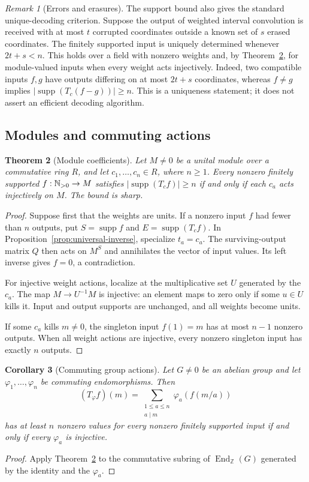 \documentclass[11pt]{article}
\DeclareMathOperator{\supp}{supp}\DeclareMathOperator{\rank}{rank}
\numberwithin{equation}{section}
\newtheorem{theorem}{Theorem}[section]
\newtheorem{corollary}[theorem]{Corollary}
\theoremstyle{definition}\newtheorem{definition}[theorem]{Definition}
\theoremstyle{remark}\newtheorem{remark}[theorem]{Remark}
\begin{document}
\begin{remark}[Errors and erasures]\label{rem:errors-erasures}
The support bound also gives the standard unique-decoding criterion.
Suppose the output of weighted interval convolution is received with at
most $t$ corrupted coordinates outside a known set of $s$ erased
coordinates. The finitely supported input is uniquely determined whenever
$2t+s<n$. This holds over a field with nonzero weights and, by
Theorem~\ref{thm:module}, for module-valued inputs when every weight acts
injectively. Indeed, two compatible inputs $f,g$ have outputs differing
on at most $2t+s$ coordinates, whereas $f\ne g$ implies
$|\supp(T_c(f-g))|\ge n$. This is a uniqueness statement; it does not
assert an efficient decoding algorithm.
\end{remark}

\subsection{Modules and commuting actions}

\begin{theorem}[Module coefficients]\label{thm:module}
Let $M\ne0$ be a unital module over a commutative ring $R$,
and let $c_1,\ldots,c_n\in R$, where $n\ge1$. Every nonzero
finitely supported $f:\mathbb N_{>0}\to M$ satisfies
$|\supp(T_cf)|\ge n$ if and only if each $c_a$ acts injectively
on $M$. The bound is sharp.
\end{theorem}
\begin{proof}
Suppose first that the weights are units. If a nonzero input $f$
had fewer than $n$ outputs, put $S=\supp f$ and $E=\supp(T_cf)$.
In Proposition~\ref{prop:universal-inverse}, specialize $t_a=c_a$.
The surviving-output matrix $Q$ then acts on $M^S$ and annihilates
the vector of input values. Its left inverse gives $f=0$, a
contradiction.

For injective weight actions, localize at the multiplicative set
$U$ generated by the $c_a$. The map $M\to U^{-1}M$ is injective:
an element maps to zero only if some $u\in U$ kills it. Input and
output supports are unchanged, and all weights become units.

If some $c_a$ kills $m\ne0$, the singleton input $f(1)=m$ has
at most $n-1$ nonzero outputs. When all weight actions are injective,
every nonzero singleton input has exactly $n$ outputs.
\end{proof}

\begin{corollary}[Commuting group actions]\label{cor:commuting-actions}
Let $G\ne0$ be an abelian group and let
$\varphi_1,\ldots,\varphi_n$ be commuting endomorphisms. Then
\[
 (T_\varphi f)(m)=
 \sum_{\substack{1\le a\le n\\a\mid m}}\varphi_a(f(m/a))
\]
has at least $n$ nonzero values for every nonzero finitely supported
input if and only if every $\varphi_a$ is injective.
\end{corollary}
\begin{proof}
Apply Theorem~\ref{thm:module} to the commutative subring of
$\operatorname{End}_{\mathbb Z}(G)$ generated by the identity
and the $\varphi_a$.
\end{proof}
\end{document}
